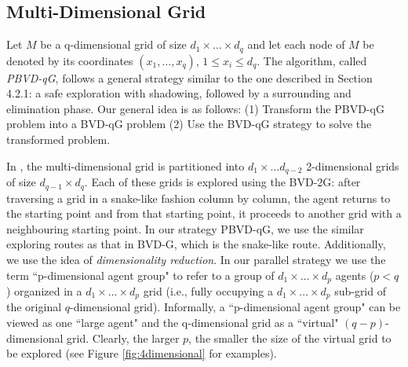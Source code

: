 \subsection{Multi-Dimensional Grid}
Let $M$ be a q-dimensional grid of size $d_1\times\ldots\times d_q$ and let each node of $M$ be denoted by its coordinates $(x_1,\ldots,x_q)$, $1\leq x_i\leq d_q$. The algorithm, called {\em PBVD-qG}, follows a general strategy similar to the one described in Section 4.2.1: a safe exploration with shadowing, followed by a surrounding and elimination phase. Our general idea is as follows: (1) Transform the PBVD-qG problem into a BVD-qG problem (2) Use the BVD-qG strategy to solve the transformed problem.

In \cite{cai}, the multi-dimensional grid is partitioned into $d_1\times \ldots d_{q-2}$ 2-dimensional grids of size $d_{q-1} \times d_q$. Each of these grids is explored using the BVD-2G: after traversing a grid in a snake-like fashion column by column, the agent returns to the starting point and from that starting point, it proceeds to another grid with a neighbouring starting point. In our strategy PBVD-qG, we use the similar exploring routes as that in BVD-G, which is the snake-like route. Additionally, we use the idea of {\em dimensionality reduction}.
In our  parallel strategy   we use the term  ``p-dimensional  agent group" to 
refer to a group of $d_1\times \ldots \times d_p$ agents   ($p<q$) organized in a $d_1\times \ldots \times d_p$ grid (i.e.,   fully occupying  a $d_1\times \ldots \times d_p$ sub-grid of the original $q$-dimensional grid). 
Informally, a ``p-dimensional  agent group" 
can  be viewed as one  ``large agent" and  the  q-dimensional grid as a  ``virtual"  $(q-p)$-dimensional grid.
Clearly, the larger $p$, the smaller the size of the virtual grid to be explored (see Figure \ref{fig:4dimensional} for examples). 
%

